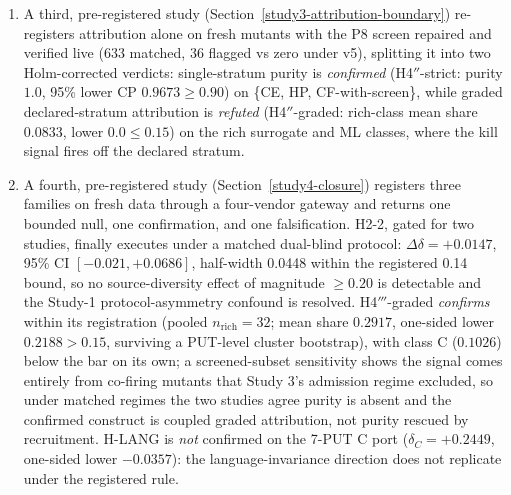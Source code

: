 \documentclass[manuscript,screen,review]{acmart}
\begin{document}
\begin{enumerate}
  powered successors on a blind-authored 28-PUT grid, executed once. Three
  confirm: H1\('\) (5/5 families clear \(\geq 8/28\)); H2-1\('\)
  (\(\delta = +0.4295\), one-sided 95\% lower \(+0.2653\), directional, not
  large); and H3\('\) (3/4 classes, class C negative). Attribution purity H4\('\)
  is \emph{not} confirmed (mean \texttt{suspect\_share} 0.1714 vs a 0.05 bar):
  multi-stratum leakage generalises beyond the Study-1 CF/TF diagnosis (TF
  72/135, OS 27/123) once the grid widens. The cross-vendor hypothesis is gated
  not-run under the same-vendor harness.
\item
  A third, pre-registered study (Section~\ref{study3-attribution-boundary})
  re-registers attribution alone on fresh mutants with the P8 screen repaired
  and verified live (633 matched, 36 flagged vs zero under v5), splitting it into
  two Holm-corrected verdicts: single-stratum purity is \emph{confirmed}
  (H4\('' \)-strict: purity \(1.0\), 95\% lower CP \(0.9673 \geq 0.90\)) on
  \{CE, HP, CF-with-screen\}, while graded declared-stratum attribution is
  \emph{refuted} (H4\('' \)-graded: rich-class mean share \(0.0833\), lower
  \(0.0 \leq 0.15\)) on the rich surrogate and ML classes, where the kill signal
  fires off the declared stratum.
\item
  A fourth, pre-registered study (Section~\ref{study4-closure}) registers three
  families on fresh data through a four-vendor gateway and returns one bounded
  null, one confirmation, and one falsification. H2-2, gated for two studies,
  finally executes under a matched dual-blind protocol:
  \(\Delta\delta = +0.0147\), 95\% CI \([-0.021, +0.0686]\), half-width 0.0448
  within the registered 0.14 bound, so no source-diversity effect of magnitude
  \(\geq 0.20\) is detectable and the Study-1 protocol-asymmetry confound is
  resolved. H4\('''\)-graded \emph{confirms} within its registration (pooled
  \(n_{\mathrm{rich}} = 32\); mean share \(0.2917\), one-sided lower
  \(0.2188 > 0.15\), surviving a PUT-level cluster bootstrap), with class C
  (\(0.1026\)) below the bar on its own; a screened-subset sensitivity shows
  the signal comes entirely from co-firing mutants that Study 3's admission
  regime excluded, so under matched regimes the two studies agree purity is
  absent and the confirmed construct is coupled graded attribution, not
  purity rescued by recruitment. H-LANG is
  \emph{not} confirmed on the 7-PUT C port (\(\delta_C = +0.2449\), one-sided
  lower \(-0.0357\)): the language-invariance direction does not replicate
  under the registered rule.
\end{enumerate}
\end{document}
